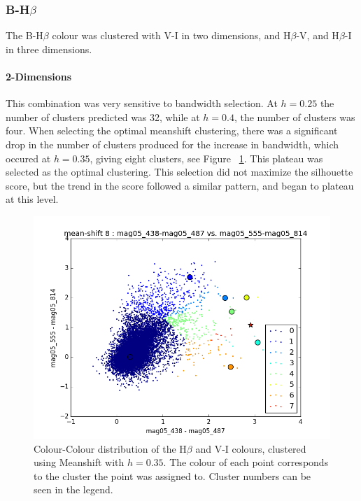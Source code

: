 
\subsubsection{B-H$\beta$}
The B-H$\beta$ colour was clustered with V-I in two dimensions, and H$\beta$-V, and H$\beta$-I in three dimensions.

\paragraph{2-Dimensions}
This combination was very sensitive to bandwidth selection. At $h=0.25$ the number of clusters predicted was 32, while at $h=0.4$, the number of clusters was four.
When selecting the optimal meanshift clustering, there was a significant drop in the number of clusters produced for the increase in bandwidth, which occured at $h=0.35$, giving eight clusters, see Figure ~\ref{fig:HBMS}.
This plateau was selected as the optimal clustering.
This selection did not maximize the silhouette score, but the trend in the score followed a similar pattern, and began to plateau at this level.

\begin{figure}
\centering
\includegraphics[width=\linewidth]{figs/meanshift_color_8cl_mag05_438-mag05_487vsmag05_555-mag05_814}
\caption{Colour-Colour distribution of the H$\beta$ and V-I colours, clustered using Meanshift with $h=0.35$. The colour of each point corresponds to the cluster the point was assigned to. Cluster numbers can be seen in the legend.}
\label{fig:HBMS}
\end{figure}

